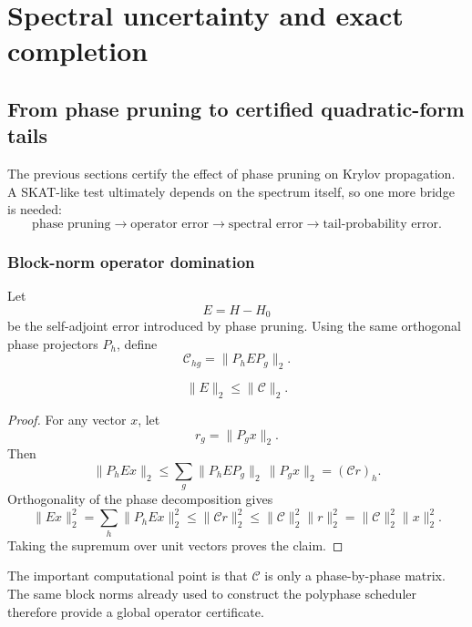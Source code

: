 \chapter{Spectral uncertainty and exact completion}\label{ch:spectrum}
\section{From phase pruning to certified quadratic-form tails}\label{sec:final-22}

The previous sections certify the effect of phase pruning on Krylov
propagation.  A SKAT-like test ultimately depends on the spectrum itself, so
one more bridge is needed:
\[
\text{phase pruning}
\longrightarrow
\text{operator error}
\longrightarrow
\text{spectral error}
\longrightarrow
\text{tail-probability error}.
\]

\subsection{Block-norm operator domination}

Let
\[
E=H-H_0
\]
be the self-adjoint error introduced by phase pruning.  Using the same
orthogonal phase projectors \(P_h\), define
\[
\mathcal C_{hg}
=
\|P_hEP_g\|_2.
\]

\begin{theorem}\label{claim:final-22-1}
\[
\boxed{
\|E\|_2
\le
\|\mathcal C\|_2.
}
\]
\end{theorem}

\begin{proof}
For any vector \(x\), let
\[
r_g=\|P_gx\|_2.
\]
Then
\[
\|P_hEx\|_2
\le
\sum_g
\|P_hEP_g\|_2\,\|P_gx\|_2
=
(\mathcal C r)_h.
\]
Orthogonality of the phase decomposition gives
\[
\|Ex\|_2^2
=
\sum_h\|P_hEx\|_2^2
\le
\|\mathcal C r\|_2^2
\le
\|\mathcal C\|_2^2\|r\|_2^2
=
\|\mathcal C\|_2^2\|x\|_2^2.
\]
Taking the supremum over unit vectors proves the claim.
\end{proof}

The important computational point is that \(\mathcal C\) is only a
phase-by-phase matrix.  The same block norms already used to construct the
polyphase scheduler therefore provide a global operator certificate.

